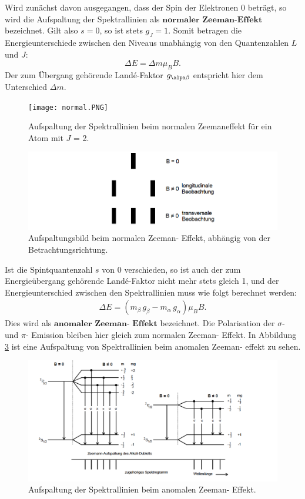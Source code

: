 \noindent Wird zunächst davon ausgegangen, dass der Spin der Elektronen 0 beträgt, so
wird die Aufspaltung der Spektrallinien als $\textbf{normaler Zeeman-Effekt}$ bezeichnet.
Gilt also $s=0$, so ist stets $g_J=1$. Somit betragen die Energieunterschiede zwischen
den Niveaus unabhängig von den Quantenzahlen $L$ und $J$:
\begin{equation}
	\Delta E = \Delta m \mu_{B} B.
\end{equation}
Der zum Übergang gehörende Landé-Faktor $g_{\alpa \beta}$ entspricht hier dem Unterschied
$\Delta m$.
\FloatBarrier
\begin{figure}
  \centering
  \texttt{[image: normal.PNG]}
  \caption{Aufspaltung der Spektrallinien beim normalen Zeemaneffekt für ein Atom mit $J$ = 2. \cite{Q1}}
  \label{abb1}
\end{figure}
\FloatBarrier

\FloatBarrier
\begin{figure}
  \centering
  \includegraphics[scale=0.5]{normal2.PNG}
  \caption{Aufspaltungsbild beim normalen Zeeman- Effekt, abhängig von der Betrachtungsrichtung. \cite{Q1}}
  \label{abb2}
\end{figure}
\FloatBarrier

Ist die Spintquantenzahl $s$ von 0 verschieden, so ist auch der zum Energieübergang gehörende
Landé-Faktor nicht mehr stets gleich 1, und der Energieunterschied zwischen den Spektrallinien
muss wie folgt berechnet werden:
\begin{align*}
    \Delta E = (m_{\beta} \, g_{\beta} - m_{\alpha} \, g_{\alpha} )\mu_{B} B.
\end{align*}
Dies wird als $\textbf{anomaler Zeeman- Effekt}$ bezeichnet.
Die Polarisation der $\sigma$- und $\pi$- Emission bleiben hier gleich zum normalen
Zeeman- Effekt.
In Abbildung \ref{abb3} ist eine Aufspaltung von Spektrallinien beim anomalen Zeeman- effekt zu sehen.

\FloatBarrier
\begin{figure}
  \centering
  \includegraphics[scale=0.5]{anomal.PNG}
  \caption{Aufspaltung der Spektrallinien beim anomalen Zeeman- Effekt. \cite{Q1}}
  \label{abb3}
\end{figure}
\FloatBarrier

